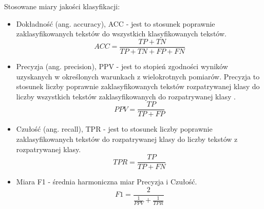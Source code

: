 \documentclass{classrep}
\begin{document}
\ \\ \\ 
Stosowane miary jakości klasyfikacji:\\
\begin{itemize}
  \item Dokładność (ang. accuracy), ACC  - jest to stosunek poprawnie zaklasyfikowanych tekstów do wszystkich klasyfikowanych tekstów.
 \begin{equation}ACC = \frac{TP + TN}{TP + TN + FP + FN} \end{equation}
 \item Precyzja (ang. precision), PPV  - jest to stopień zgodności wyników uzyskanych w określonych warunkach z wielokrotnych pomiarów. Precyzja to stosunek liczby poprawnie zaklasyfikowanych tekstów rozpatrywanej klasy do liczby wszystkich tekstów zaklasyfikowanych do rozpatrywanej klasy . 
 \begin{equation} PPV =  \frac{TP} {TP+FP} \end{equation}
\item Czułość (ang. recall), TPR  - jest to stosunek liczby poprawnie zaklasyfikowanych tekstów do rozpatrywanej klasy do liczby tekstów z rozpatrywanej klasy. 
 \begin{equation}   TPR = \frac{TP}{TP + FN} \end{equation}
\item Miara F1 - średnia harmoniczna miar Precyzja i Czułość. 
\begin{equation}   F1 = \frac{2}{\frac{1}{PPV} + \frac{1}{TPR}} \end{equation}
\end{itemize}
\end{document}
